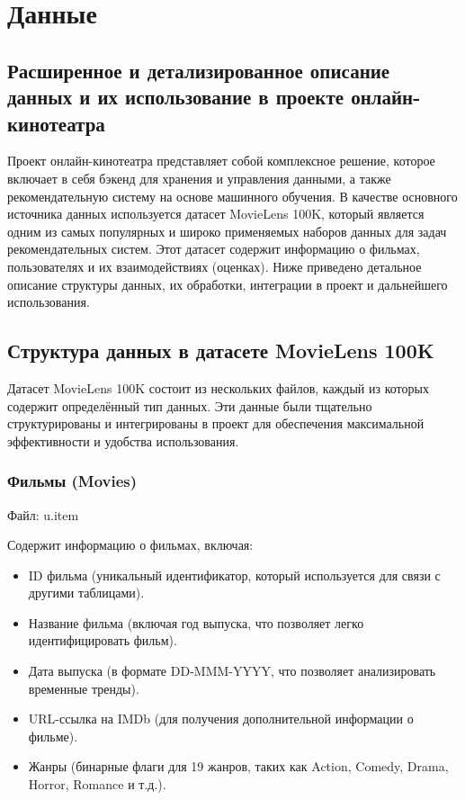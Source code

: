 \chapter{Данные}
\label{ch:data}

\section{Расширенное и детализированное описание данных и их использование в проекте онлайн-кинотеатра}

Проект онлайн-кинотеатра представляет собой комплексное решение, которое включает в себя бэкенд для хранения и управления данными, а также рекомендательную систему на основе машинного обучения. В качестве основного источника данных используется датасет MovieLens 100K, который является одним из самых популярных и широко применяемых наборов данных для задач рекомендательных систем. Этот датасет содержит информацию о фильмах, пользователях и их взаимодействиях (оценках). Ниже приведено детальное описание структуры данных, их обработки, интеграции в проект и дальнейшего использования.

\section{Структура данных в датасете MovieLens 100K}

Датасет MovieLens 100K состоит из нескольких файлов, каждый из которых содержит определённый тип данных. Эти данные были тщательно структурированы и интегрированы в проект для обеспечения максимальной эффективности и удобства использования.

\subsection*{Фильмы (Movies)}
Файл: u.item

Содержит информацию о фильмах, включая:
\begin{itemize}
    \item ID фильма (уникальный идентификатор, который используется для связи с другими таблицами).
    \item Название фильма (включая год выпуска, что позволяет легко идентифицировать фильм).
    \item Дата выпуска (в формате DD-MMM-YYYY, что позволяет анализировать временные тренды).
    \item URL-ссылка на IMDb (для получения дополнительной информации о фильме).
    \item Жанры (бинарные флаги для 19 жанров, таких как Action, Comedy, Drama, Horror, Romance и т.д.).
\end{itemize}

